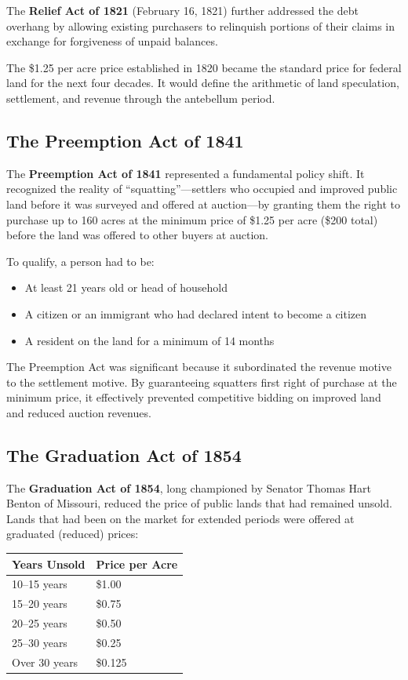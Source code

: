\documentclass[12pt]{article}
\begin{document}
The \textbf{Relief Act of 1821} (February 16, 1821) further addressed the debt overhang by allowing existing purchasers to relinquish portions of their claims in exchange for forgiveness of unpaid balances.

The \$1.25 per acre price established in 1820 became the standard price for federal land for the next four decades.  It would define the arithmetic of land speculation, settlement, and revenue through the antebellum period.

\subsection{The Preemption Act of 1841}

The \textbf{Preemption Act of 1841} represented a fundamental policy shift.  It recognized the reality of ``squatting''---settlers who occupied and improved public land before it was surveyed and offered at auction---by granting them the right to purchase up to 160 acres at the minimum price of \$1.25 per acre (\$200 total) before the land was offered to other buyers at auction.

To qualify, a person had to be:
\begin{itemize}
\item At least 21 years old or head of household
\item A citizen or an immigrant who had declared intent to become a citizen
\item A resident on the land for a minimum of 14 months
\end{itemize}

The Preemption Act was significant because it subordinated the revenue motive to the settlement motive.  By guaranteeing squatters first right of purchase at the minimum price, it effectively prevented competitive bidding on improved land and reduced auction revenues.

\subsection{The Graduation Act of 1854}

The \textbf{Graduation Act of 1854}, long championed by Senator Thomas Hart Benton of Missouri, reduced the price of public lands that had remained unsold.  Lands that had been on the market for extended periods were offered at graduated (reduced) prices:

\begin{center}
\begin{tabular}{ll}
\toprule
Years Unsold & Price per Acre \\
\midrule
10--15 years & \$1.00 \\
15--20 years & \$0.75 \\
20--25 years & \$0.50 \\
25--30 years & \$0.25 \\
Over 30 years & \$0.125 \\
\bottomrule
\end{tabular}
\end{center}
\end{document}
